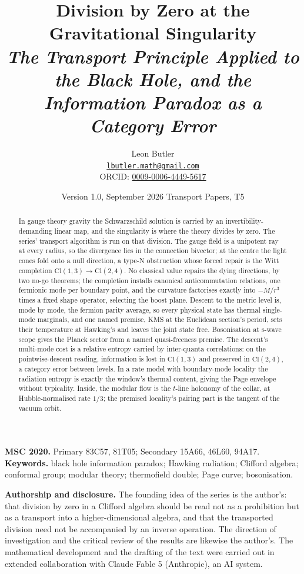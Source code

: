 \documentclass[11pt]{article}
\title{\bfseries Division by Zero at the Gravitational Singularity\\[4pt]
  \large\itshape The Transport Principle Applied to the Black Hole, and the Information Paradox as a Category Error}
\author{Leon Butler\\ \normalsize\href{mailto:lbutler.math@gmail.com}{\texttt{lbutler.math@gmail.com}}\\ \normalsize ORCID: \href{https://orcid.org/0009-0006-4449-5617}{0009-0006-4449-5617}}
\date{Version 1.0, September 2026 \textperiodcentered{} Transport Papers, T5}
\theoremstyle{definition}
\newcommand{\Cl}{\mathrm{Cl}}
\begin{document}
\maketitle

\begin{abstract}
\normalsize
In gauge theory gravity the Schwarzschild solution is carried by an invertibility-demanding linear map, and the singularity is where the theory divides by zero. The series' transport algorithm is run on that division. The gauge field is a unipotent ray at every radius, so the divergence lies in the connection bivector; at the centre the light cones fold onto a null direction, a type-N obstruction whose forced repair is the Witt completion $\Cl(1,3) \to \Cl(2,4)$. No classical value repairs the dying directions, by two no-go theorems; the completion installs canonical anticommutation relations, one fermionic mode per boundary point, and the curvature factorises exactly into $-M/r^3$ times a fixed shape operator, selecting the boost plane. Descent to the metric level is, mode by mode, the fermion parity average, so every physical state has thermal single-mode marginals, and one named premise, KMS at the Euclidean section's period, sets their temperature at Hawking's and leaves the joint state free. Bosonisation at s-wave scope gives the Planck sector from a named quasi-freeness premise. The descent's multi-mode cost is a relative entropy carried by inter-quanta correlations: on the pointwise-descent reading, information is lost in $\Cl(1,3)$ and preserved in $\Cl(2,4)$, a category error between levels. In a rate model with boundary-mode locality the radiation entropy is exactly the window's thermal content, giving the Page envelope without typicality. Inside, the modular flow is the $t$-line holonomy of the collar, at Hubble-normalised rate $1/3$; the premised locality's pairing part is the tangent of the vacuum orbit.
\end{abstract}

\medskip
\noindent\textbf{MSC 2020.} Primary 83C57, 81T05; Secondary 15A66, 46L60, 94A17.\\
\textbf{Keywords.} black hole information paradox; Hawking radiation; Clifford algebra; conformal group; modular theory; thermofield double; Page curve; bosonisation.

\newpage
\textbf{Authorship and disclosure. }The founding idea of the series is the author's: that division by zero in a Clifford algebra should be read not as a prohibition but as a transport into a higher-dimensional algebra, and that the transported division need not be accompanied by an inverse operation. The direction of investigation and the critical review of the results are likewise the author's. The mathematical development and the drafting of the text were carried out in extended collaboration with Claude Fable 5 (Anthropic), an AI system.
\end{document}
